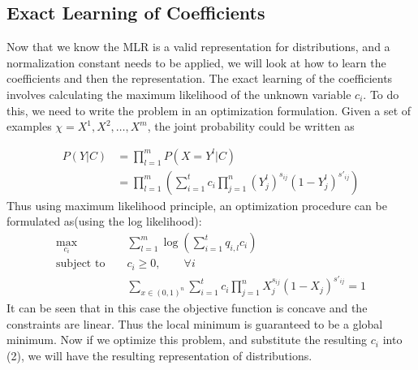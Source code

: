 \documentclass[11pt]{article}
\begin{document}
\subsection{Exact Learning of Coefficients }
Now that we know the MLR is a valid representation for distributions, and a normalization constant needs to be applied, we will look at how to learn the coefficients and then the representation.
The exact learning of the coefficients involves calculating the maximum likelihood of the unknown variable $c_i$. To do this, we need to write the problem in an optimization formulation. Given a set of examples $\chi={X^1,X^2,\ldots,X^m}$, the joint probability could be written as 

\begin{align*}
P(Y|C)& =  \prod\limits_{l=1}^{m}P(X=Y^l|C) \\
& =\prod\limits_{l=1}^{m}(\sum\limits_{i=1}^{t}c_i\prod\limits_{j=1}^{n}{(Y_j^l)}^{s_{ij}}{(1-Y_j^l)}^{s'_{ij}})
\end{align*}
Thus using maximum likelihood principle, an optimization procedure can be formulated as(using the log likelihood):
\begin{eqnarray*}
	\max_{c_i} & & \sum\limits_{l=1}^{m}\log(\sum\limits_{i=1}^{t}q_{i,l}c_i)  \label{eq:lin_prog_discriminant_obj}\\
	\textrm{subject to } & & c_i\geq 0, \qquad \forall i \label{eq:lin_prog_discriminant_constraint}\\
	& & \sum\limits_{x\in {(0,1)}^n}\sum\limits_{i=1}^{t}c_i\prod\limits_{j=1}^{n}X_j^{s_{ij}}{(1-X_j)}^{s'_{ij}}=1 \label{eq:lin_prog_discriminant_bound}
\end{eqnarray*}
It can be seen that in this case the objective function is concave and the constraints are linear. Thus the local minimum is guaranteed to be a global minimum. Now if we optimize this problem, and substitute the resulting $c_i$ into (2), we will have the resulting representation of distributions. 
\end{document}
